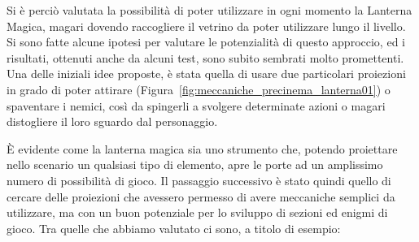 Si è perciò valutata la possibilità di poter utilizzare in ogni momento la Lanterna Magica, magari dovendo raccogliere il vetrino da poter utilizzare lungo il livello. Si sono fatte alcune ipotesi per valutare le potenzialità di questo approccio, ed i risultati, ottenuti anche da alcuni test, sono subito sembrati molto promettenti.
Una delle iniziali idee proposte, è stata quella di usare due particolari proiezioni in grado di poter attirare (Figura~\ref{fig:meccaniche_precinema_lanterna01}) o spaventare i nemici, così da spingerli a svolgere determinate azioni o magari distogliere il loro sguardo dal personaggio.

È evidente come la lanterna magica sia uno strumento che, potendo proiettare nello scenario un qualsiasi tipo di elemento, apre le porte ad un amplissimo numero di possibilità di gioco.
Il passaggio successivo è stato quindi quello di cercare delle proiezioni che avessero permesso di avere meccaniche semplici da utilizzare, ma con un buon potenziale per lo sviluppo di sezioni ed enigmi di gioco. Tra quelle che abbiamo valutato ci sono, a titolo di esempio:
\label{par:tipologie_vetrini}


